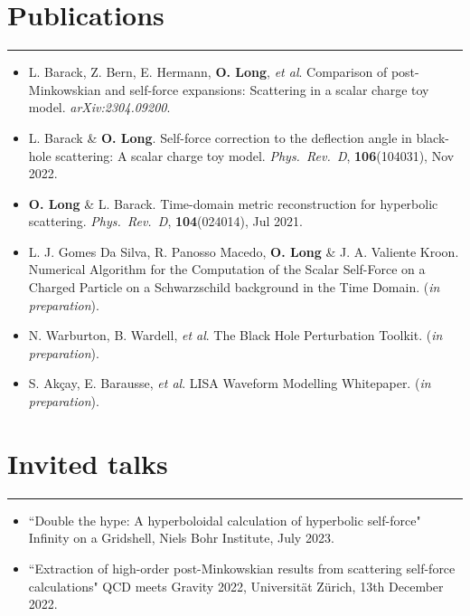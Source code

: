 \documentclass[10.5pt, oneside]{article}   	%
\begin{document}
{\color{Sectioncolour}
\section*{Publications}
\vspace{-3mm}
\noindent\rule{\linewidth}{0.6pt}}
\begin{itemize}
\item L. Barack, Z. Bern, E. Hermann, {\bf O. Long}, {\it et al}. Comparison of post-Minkowskian and self-force expansions: Scattering in a scalar charge toy model. {\it arXiv:2304.09200}. \href{https://arxiv.org/abs/2304.09200}{}
\item L. Barack \& {\bf O. Long}. Self-force correction to the deflection angle in black-hole scattering: A scalar charge toy model. {\it Phys.\ Rev.\ D}, {\bf 106}(104031), Nov 2022. \href{https://journals.aps.org/prd/abstract/10.1103/PhysRevD.106.104031}{}
\item {\bf O. Long} \& L. Barack. Time-domain metric reconstruction for hyperbolic scattering. {\it Phys.\ Rev.\ D}, {\bf 104}(024014), Jul 2021. \href{https://journals.aps.org/prd/abstract/10.1103/PhysRevD.104.024014}
{}
\item L. J. Gomes Da Silva, R. Panosso Macedo, {\bf O. Long} \& J. A. Valiente Kroon. Numerical Algorithm for the Computation of the Scalar Self-Force on a Charged Particle on a Schwarzschild background in the Time Domain. ({\it in preparation}).
\item N. Warburton, B. Wardell, {\it et al}. The Black Hole Perturbation Toolkit. ({\it in preparation}).
\item S. Akçay, E. Barausse, {\it et al}. LISA Waveform Modelling Whitepaper. ({\it in preparation}).
\end{itemize} 

 
  {\color{Sectioncolour}
\section*{Invited talks}
\vspace{-3mm}
\noindent\rule{\linewidth}{0.6pt}}
\begin{itemize}
\item``Double the hype: A hyperboloidal calculation of hyperbolic self-force" Infinity on a Gridshell, Niels Bohr Institute, July 2023.
\item``Extraction of high-order post-Minkowskian results from scattering self-force calculations" QCD meets Gravity 2022, Universität Zürich, 13th December 2022.
\end{itemize} 
 
\end{document}
